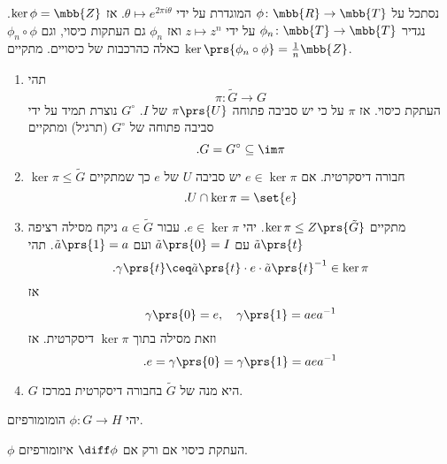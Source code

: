 \documentclass[10pt, twoside]{book}
\newcommand{\textenglish}[1]{\foreignlanguage{english}{#1}}
\begin{document}
\begin{example}
נסתכל על
$\phi \colon \mbb{R} \to \mbb{T}$
המוגדרת על ידי
$\theta \mapsto e^{2 \pi i \theta}$.
אז
$\ker \phi = \mbb{Z}$.
נגדיר
$\phi_n \colon \mbb{T} \to \mbb{T}$
על ידי
$z \mapsto z^n$
ואז
$\phi_n$
גם העתקות כיסוי, וגם
$\phi_n \circ \phi$
כאלה כהרכבות של כיסויים. מתקיים
$\ker \prs{\phi_n \circ \phi} = \frac{1}{n} \mbb{Z}$.
\end{example}

\begin{proposition}
\begin{enumerate}
\item תהי
\[\pi \colon \tilde{G} \to G\]
העתקת כיסוי. אז
$\pi$
על כי יש סביבה פתוחה
$\pi\prs{U}$
של
\textenglish{$I$}.
\textenglish{$G^\circ$}
נוצרת תמיד על ידי סביבה פתוחה של
$G^\circ$ (תרגיל)
ומתקיים
\[\text{.} G = G^\circ \subseteq \im \pi\]

\item
$\ker \pi \leq \tilde{G}$
חבורה דיסקרטית. אם
$e \in \ker \pi$
יש סביבה
$U$
של
$e$
כך שמתקיים
\[\text{.} U \cap \ker \pi = \set{e}\]

\item מתקיים
$\ker \pi \leq Z\prs{\tilde{G}}$.
יהי
$e \in \ker \pi$.
 עבור
 $a \in \tilde{G}$
 ניקח מסילה רציפה
$\tilde{a}\prs{t}$
עם
$\tilde{a}\prs{0} = I$
ועם
$\tilde{a} \prs{1} = a$.
תהי
\[\text{.} \gamma\prs{t} \ceq \tilde{a}\prs{t} \cdot e \cdot \tilde{a}\prs{t}^{-1} \in \ker \pi\]
אז
\[\gamma\prs{0} = e, \quad \gamma\prs{1} = aea^{-1}\]
וזאת מסילה בתוך
$\ker \pi$
דיסקרטית.
אז
\[\text{.} e = \gamma\prs{0} = \gamma\prs{1} = aea^{-1}\]

\item $G$
היא מנה של
$\tilde{G}$
בחבורה דיסקרטית במרכז.
\end{enumerate}
\end{proposition}

\begin{lemma}
יהי
$\phi \colon G \to H$
הומומורפיזם.

$\phi$
העתקת כיסוי אם ורק אם
$\diff \phi$
איזומורפיזם.
\end{lemma}
\end{document}
